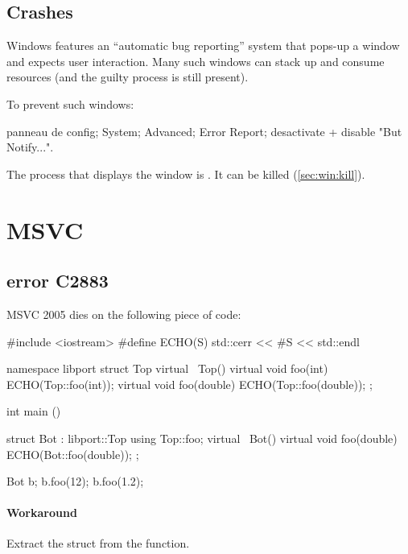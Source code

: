 \documentclass[openright,twoside,11pt]{book}
\newenvironment{workaround}{\paragraph{Workaround}}{}
\begin{document}

\subsection{Crashes}

Windows features an ``automatic bug reporting'' system that pops-up a
window and expects user interaction.  Many such windows can stack up
and consume resources (and the guilty process is still present).

To prevent such windows:

panneau de config; System; Advanced; Error Report; desactivate +
disable "But Notify...".

The process that displays the window is .  It can
be killed (\autoref{sec:win:kill}).

\section{MSVC}

\subsection{error C2883}
MSVC 2005 dies on the following piece of code:

\begin{cxx}
#include <iostream>
#define ECHO(S) std::cerr << #S << std::endl

namespace libport
{
  struct Top
  {
    virtual ~Top() {}
    virtual void foo(int)    { ECHO(Top::foo(int)); }
    virtual void foo(double) { ECHO(Top::foo(double)); }
  };
}

int
main ()
{
  struct Bot : libport::Top
  {
    using Top::foo;
    virtual ~Bot() {}
    virtual void foo(double) { ECHO(Bot::foo(double)); }
  };

  Bot b;
  b.foo(12);
  b.foo(1.2);
}
\end{cxx}


\begin{workaround}
  Extract the struct from the function.
\end{workaround}


\chapterIndex
\end{document}
